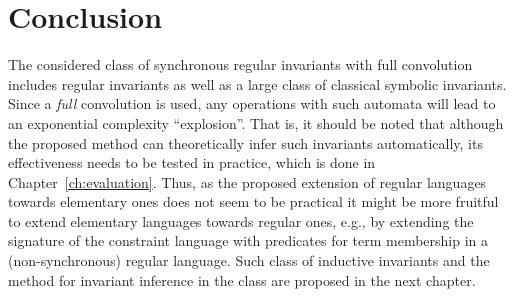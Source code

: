 \section{Conclusion}
The considered class of synchronous regular invariants with full convolution includes regular invariants as well as a large class of classical symbolic invariants. Since a \emph{full} convolution is used, any operations with such automata will lead to an exponential complexity ``explosion''. That is, it should be noted that although the proposed method can theoretically infer such invariants automatically, its effectiveness needs to be tested in practice, which is done in Chapter~\cref{ch:evaluation}.
Thus, as the proposed extension of regular languages towards elementary ones does not seem to be practical it might be more fruitful to extend elementary languages towards regular ones, e.g., by extending the signature of the constraint language with predicates for term membership in a (non-synchronous) regular language.
Such class of inductive invariants and the method for invariant inference in the class are proposed in the next chapter.
